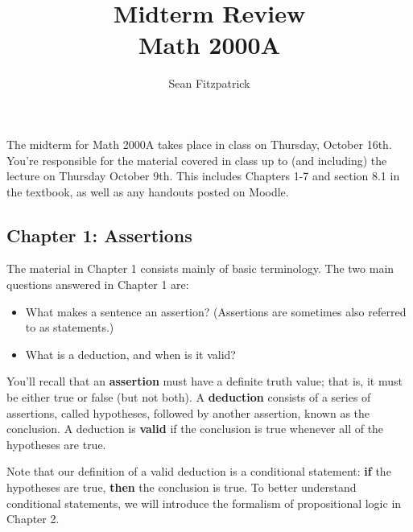 \documentclass[letterpaper,12pt]{article}
\title{Midterm Review\\Math 2000A}
\author{Sean Fitzpatrick}
\date{}
\begin{document}
 \maketitle


The midterm for Math 2000A takes place in class on Thursday, October 16th. You're responsible for the material covered in class up to (and including) the lecture on Thursday October 9th. This includes Chapters 1-7 and section 8.1 in the textbook, as well as any handouts posted on Moodle.

\subsection*{Chapter 1: Assertions}
The material in Chapter 1 consists mainly of basic terminology. The two main questions answered in Chapter 1 are:
\begin{itemize}
 \item What makes a sentence an assertion? (Assertions are sometimes also referred to as statements.)
 \item What is a deduction, and when is it valid?
\end{itemize}
You'll recall that an {\bf assertion} must have a definite truth value; that is, it must be either true or false (but not both). A {\bf deduction} consists of a series of assertions, called hypotheses, followed by another assertion, known as the conclusion. A deduction is {\bf valid} if the conclusion is true whenever all of the hypotheses are true.

Note that our definition of a valid deduction is a conditional statement: {\bf if} the hypotheses are true, {\bf then} the conclusion is true. To better understand conditional statements, we will introduce the formalism of propositional logic in Chapter 2.

\bigskip
\end{document}
